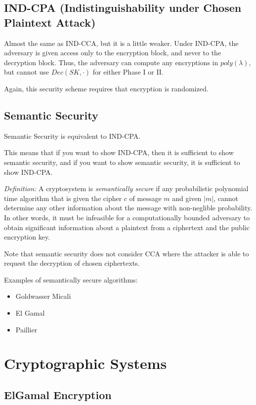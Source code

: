 \documentclass[psamsfonts]{amsart}
\begin{document}
\subsection{IND-CPA (Indistinguishability under Chosen Plaintext Attack)}

Almost the same as IND-CCA, but it is a little weaker. Under IND-CPA, the adversary is given access only to the encryption block, and never to the decryption block. Thus, the adversary can compute any encryptions in $poly(\lambda)$, but cannot use $Dec(SK, \cdot)$ for either Phase I or II.

Again, this security scheme requires that encryption is randomized.

\subsection{Semantic Security}

Semantic Security is equivalent to IND-CPA.

This means that if you want to show IND-CPA, then it is sufficient to show semantic security, and if you want to show semantic security, it is sufficient to show IND-CPA.

\emph{Definition:} A cryptosystem is \emph{semantically secure} if any probabilistic polynomial time algorithm that is given the cipher $c$ of message $m$ and given $|m|$, cannot determine any other information about the message with non-neglible probability. In other words, it must be infeasible for a computationally bounded adversary to obtain significant information about a plaintext from a ciphertext and the public encryption key.

Note that semantic security does not consider CCA where the attacker is able to request the decryption of chosen ciphertexts.

Examples of semantically secure algorithms:
\begin{itemize}
  \item Goldwasser Micali
  \item El Gamal
  \item Paillier
\end{itemize}

\section{Cryptographic Systems}

\subsection{ElGamal Encryption}
\end{document}
